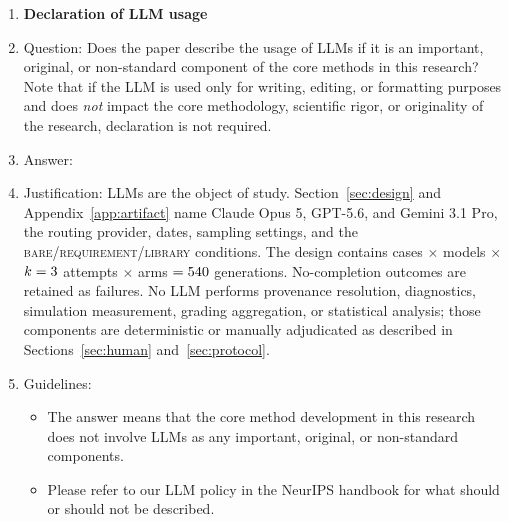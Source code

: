 \begin{enumerate}
\item {\bf Declaration of LLM usage}
    \item[] Question: Does the paper describe the usage of LLMs if it is an important, original, or non-standard component of the core methods in this research? Note that if the LLM is used only for writing, editing, or formatting purposes and does \emph{not} impact the core methodology, scientific rigor, or originality of the research, declaration is not required.
    \item[] Answer: \answerYes{}
    \item[] Justification: LLMs are the object of study. Section~\ref{sec:design} and Appendix~\ref{app:artifact} name Claude Opus 5, GPT-5.6, and Gemini 3.1 Pro, the routing provider, dates, sampling settings, and the \textsc{bare}/\textsc{requirement}/\textsc{library} conditions. The design contains \NumCases{} cases $\times$ \NumModels{} models $\times$ $k=3{}$ attempts $\times$ \CorpusArms{} arms $=540{}$ generations. No-completion outcomes are retained as failures. No LLM performs provenance resolution, diagnostics, simulation measurement, grading aggregation, or statistical analysis; those components are deterministic or manually adjudicated as described in Sections~\ref{sec:human} and~\ref{sec:protocol}.
    \item[] Guidelines:
    \begin{itemize}
        \item The answer \answerNA{} means that the core method development in this research does not involve LLMs as any important, original, or non-standard components.
        \item Please refer to our LLM policy in the NeurIPS handbook for what should or should not be described.
    \end{itemize}

\end{enumerate}
